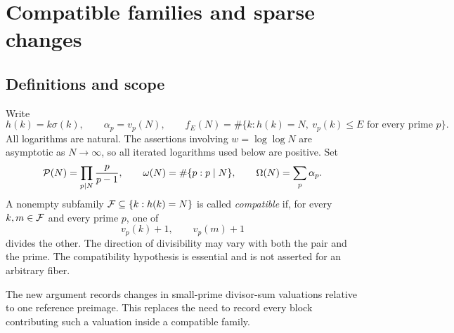\chapter{Compatible families and sparse changes}\label{ch:sparse}
\section{Definitions and scope}
Write
\[
 h(k)=k\sigma(k),\qquad \alpha_p=v_p(N),\qquad
 f_E(N)=\#\{k:h(k)=N,\ v_p(k)\le E\text{ for every prime }p\}.
\]
All logarithms are natural. The assertions involving $w=\log\log N$ are asymptotic as $N\to\infty$, so all iterated logarithms used below are positive. Set
\[
 \mathcal P(N)=\prod_{p\mid N}\frac{p}{p-1},\qquad
 \omega(N)=\#\{p:p\mid N\},\qquad \Omega(N)=\sum_p\alpha_p.
\]
A nonempty subfamily $\mathcal F\subseteq\{k:h(k)=N\}$ is called \emph{compatible} if, for every $k,m\in\mathcal F$ and every prime $p$, one of
\[
 v_p(k)+1,\qquad v_p(m)+1
\]
divides the other. The direction of divisibility may vary with both the pair and the prime. The compatibility hypothesis is essential and is not asserted for an arbitrary fiber.

The new argument records changes in small-prime divisor-sum valuations relative to one reference preimage. This replaces the need to record every block contributing such a valuation inside a compatible family.


